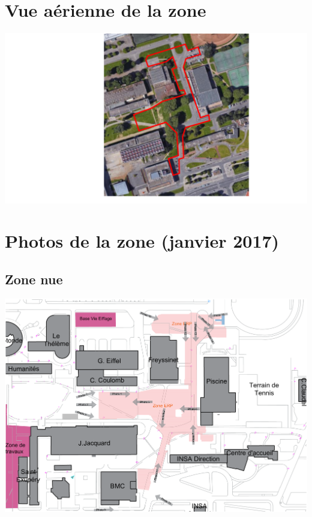 \documentclass[hidelinks, paper=a4, fontsize=13pt]{report}
\begin{document}
\section{Vue aérienne de la zone}

\begin{center}
	\includegraphics[width=.8\textwidth,keepaspectratio]{Exports/ERP_vue_aerienne.pdf}
\end{center}
\newpage
\section{Photos de la zone (janvier 2017)}
\subsection{Zone nue}
\begin{center}
	\includegraphics[angle=90,width=.8\textwidth,keepaspectratio]{Exports/Plan_24h_45eme-Photos_Zone}
\end{center}
\newpage
\end{document}
